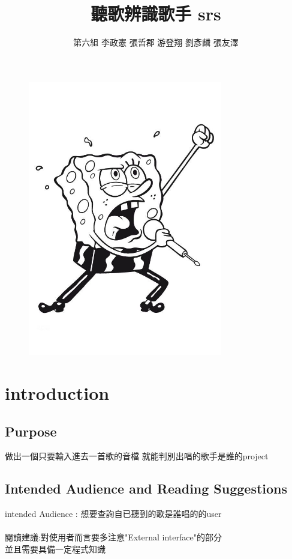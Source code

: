 \documentclass{article}
\begin{document}
\begin{CJK}{UTF8}{bkai}
\title{\Huge \color{blue} 聽歌辨識歌手  srs }
\author{第六組   李政憲 張哲郡 游登翔 劉彥麟 張友澤}
\maketitle
\begin{figure}[h]
\begin{center}
\includegraphics[width=8.5cm]{sing.jpg}
\end{center}
\label{fig:1}
\end{figure}
\newpage
\section{\huge \bf \color{blue}  introduction\\}

\subsection{\Large Purpose\\}
\large 做出一個只要輸入進去一首歌的音檔 就能判別出唱的歌手是誰的project
\subsection{\Large Intended Audience and Reading Suggestions\\}
\large intended Audience : 想要查詢自已聽到的歌是誰唱的的user \\\\
閱讀建議:對使用者而言要多注意"External interface"的部分\\
並且需要具備一定程式知識

\end{CJK}
\end{document}
